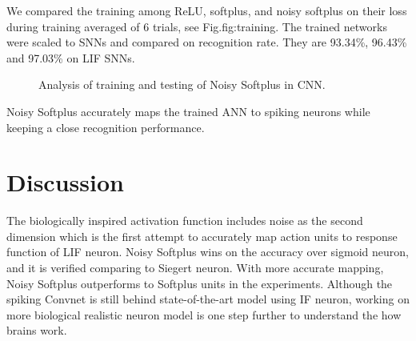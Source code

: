 \documentclass[runningheads,a4paper]{llncs}
\begin{document}
We compared the training among ReLU, softplus, and noisy softplus on their loss during training averaged of 6 trials, see Fig.{fig:training}.
The trained networks were scaled to SNNs and compared on recognition rate.
They are 93.34\%, 96.43\% and 97.03\% on LIF SNNs.
\begin{figure}[bt!]
	\centering
	\caption{
	Analysis of training and testing of Noisy Softplus in CNN.}
	\label{fig:training}	
\end{figure}

Noisy Softplus accurately maps the trained ANN to spiking neurons while keeping a close recognition performance.
\section{Discussion}
The biologically inspired activation function includes noise as the second dimension which is the first attempt to accurately map action units to response function of LIF neuron.
Noisy Softplus wins on the accuracy over sigmoid neuron, and it is verified comparing to Siegert neuron.
With more accurate mapping, Noisy Softplus outperforms to Softplus units in the experiments.
Although the spiking Convnet is still behind state-of-the-art model using IF neuron, working on more biological realistic neuron model is one step further to understand the how brains work.
\end{document}
